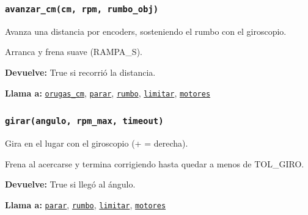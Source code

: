 \subsubsection{\texttt{avanzar\_\allowbreak{}cm(cm, rpm, rumbo\_\allowbreak{}obj)}}\label{fn:funciones_rover:avanzar-cm}
\noindent Avanza una distancia por encoders, sosteniendo el rumbo con el giroscopio.

Arranca y frena suave (RAMPA\_S).

\par{}\par\smallskip
\noindent\textbf{Devuelve:} True si recorrió la distancia.\par
\noindent\textbf{Llama a:} \hyperref[fn:funciones_rover:orugas-cm]{\texttt{orugas\_\allowbreak{}cm}}, \hyperref[fn:funciones_rover:parar]{\texttt{parar}}, \hyperref[fn:funciones_rover:rumbo]{\texttt{rumbo}}, \hyperref[fn:funciones_rover:limitar]{\texttt{limitar}}, \hyperref[fn:funciones_rover:motores]{\texttt{motores}}\par

\subsubsection{\texttt{girar(angulo, rpm\_\allowbreak{}max, timeout)}}\label{fn:funciones_rover:girar}
\noindent Gira en el lugar con el giroscopio (+ = derecha).

Frena al acercarse y termina corrigiendo hasta quedar a menos de TOL\_GIRO.

\par{}\par\smallskip
\noindent\textbf{Devuelve:} True si llegó al ángulo.\par
\noindent\textbf{Llama a:} \hyperref[fn:funciones_rover:parar]{\texttt{parar}}, \hyperref[fn:funciones_rover:rumbo]{\texttt{rumbo}}, \hyperref[fn:funciones_rover:limitar]{\texttt{limitar}}, \hyperref[fn:funciones_rover:motores]{\texttt{motores}}\par

